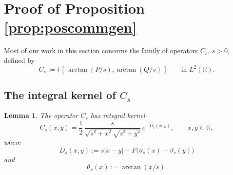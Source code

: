 \documentclass[10pt,a4paper]{amsart}
\newtheorem{lemma}[theorem]{Lemma}
\newcommand{\R}{\mathbb{R}}
\newcommand{\abs}[1]{\left\lvert #1\right\rvert}
\begin{document}

\section{Proof of Proposition \ref{prop:poscommgen}}\label{sec:poscommgen}

Most of our work in this section concerns the family of operators
$C_s$, $s>0$, defined by
\[
C_s:=i\,[\,\arctan(P/s),\arctan(Q/s)\,]
\qquad\text{in }L^2(\R).
\]


\subsection*{The integral kernel of $C_s$}

\begin{lemma}\label{lem:intkernel}
The operator $C_s$ has integral kernel
\[
C_s(x,y)=\frac12\,
\frac{s}{\sqrt{s^2+x^2}\sqrt{s^2+y^2}}\,e^{-D_s(x,y)},
\qquad x,y\in\R,
\]
where
\begin{equation}\label{eq:Ds-def}
D_s(x,y):=s\abs{x-y}
-F\bigl(\vartheta_s(x)-\vartheta_s(y)\bigr)
\end{equation}
and
\begin{equation}\label{eq:theta-s}
\vartheta_s(x):=\arctan(x/s).
\end{equation}
\end{lemma}
\end{document}
